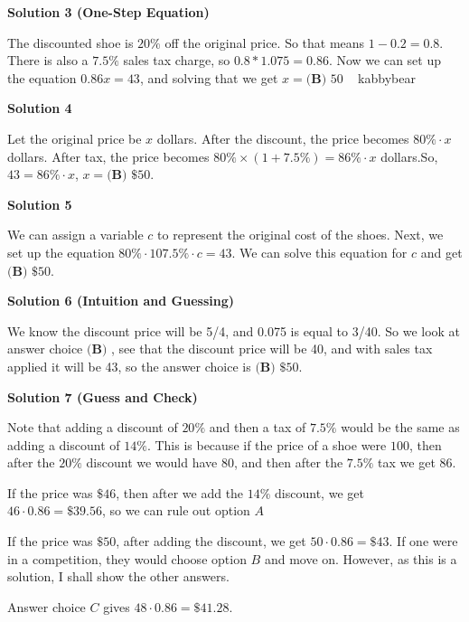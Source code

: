 \begin{enumerate}
\textbf{Solution 3 (One-Step Equation)}

The discounted shoe is $20\%$ off the original price. So that means $1 - 0.2 = 0.8$. There is also a $7.5\%$ sales tax charge, so $0.8 * 1.075 = 0.86$. Now we can set up the equation $0.86x = 43$, and solving that we get $x=\boxed{\textbf{(B) }50}$ ~ kabbybear

 



\textbf{Solution 4}

Let the original price be $x$ dollars. After the discount, the price becomes $80\%\cdot x$ dollars. After tax, the price becomes $80\% \times (1+7.5\%) = 86\% \cdot x$ dollars.So, $43=86\% \cdot x$, $x=\boxed{\textbf{(B) }\$50}.$




\textbf{Solution 5}

We can assign a variable $c$ to represent the original cost of the shoes. Next, we set up the equation $80\%\cdot107.5\%\cdot c=43$. We can solve this equation for $c$ and get $\boxed{\textbf{(B) }\$50}$.

 



\textbf{Solution 6 (Intuition and Guessing)}

We know the discount price will be 5/4, and 0.075 is equal to 3/40. So we look at answer choice $\textbf{(B) }$, see that the discount price will be 40, and with sales tax applied it will be 43, so the answer choice is $\boxed{\textbf{(B) }\$50}$.

 



\textbf{Solution 7 (Guess and Check)}

Note that adding a discount of $20\%$ and then a tax of $7.5\%$ would be the same as adding a discount of $14\%$. This is because if the price of a shoe were $100$, then after the $20\%$ discount we would have $80$, and then after the $7.5\%$ tax we get $86$.

 If the price was $\text{\$46}$, then after we add the $14\%$ discount, we get $46 \cdot 0.86 = \text{\$39.56}$, so we can rule out option $A$

 If the price was $\text{\$50}$, after adding the discount, we get $50 \cdot 0.86 = \text{\$43}$. If one were in a competition, they would choose option $B$ and move on. However, as this is a solution, I shall show the other answers.

 Answer choice $C$ gives $48 \cdot 0.86 = \text{\$41.28}$.


\end{enumerate}
